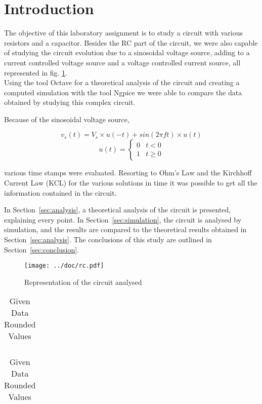 \section{Introduction}
\label{sec:introduction}

The objective of this laboratory assignment is to study a circuit with various resistors and a capacitor. Besides the RC part of the circuit, we were also 
capable of studying the circuit evolution due to a sinosoidal voltage source, adding to a current controlled voltage source and a voltage controlled current source, 
all represented in fig. \ref{fig:rc}. \\
Using the tool Octave for a theoretical analysis of the circuit and creating a computed simulation with the tool Ngpice we were able to compare the data obtained by 
studying this complex circuit.

Because of the sinosoidal voltage source,

\vspace{-13mm}
\begin{multicols}{2}
    \begin{equation}
        v_s(t) = V_s \times u(-t) + sin(2\pi ft) \times u(t)
    \end{equation}\break
    \begin{equation}
        u(t) = \begin{cases} 0 & t < 0 \\ 1 & t \ge 0 \end{cases}
    \end{equation}
\end{multicols}

various time stamps were evaluated.
Resorting to Ohm's Law and the Kirchhoff Current Law (KCL) for the various solutions in time it was possible to get all the information contained in the circuit. 

In Section~\ref{sec:analysis}, a theoretical analysis of the circuit is presented, explaining every point. 
In Section~\ref{sec:simulation}, the circuit is analysed by simulation, and the results are compared to the theoretical results obtained in
Section~\ref{sec:analysis}. The conclusions of this study are outlined in Section~\ref{sec:conclusion}.


\begin{figure}[h] 
    \centering
    \texttt{[image: ../doc/rc.pdf]}
    \caption{Representation of the circuit analysed}
    \label{fig:rc}
\end{figure}
    

\begin{table}[h]
    \centering
    \begin{tabular}{c|c|c|c|c}  
        \hline
        
    \end{tabular}
    \begin{tabular}{c|c|c|c|c|c}
        \hline
         
    \end{tabular}
    \caption{Given Data Rounded Values}
    \label{tab:data}
\end{table}

